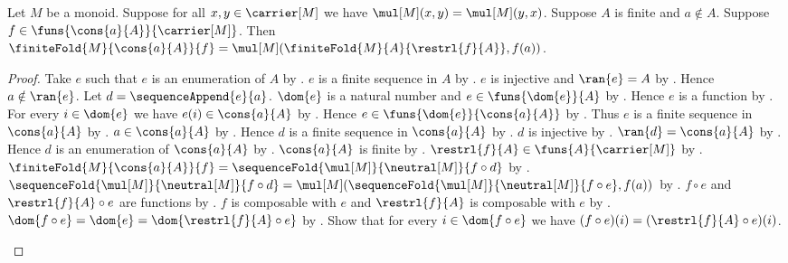\begin{theorem}\label{monoid_finite_fold_fresh_adjoin}
    Let $M$ be a monoid.
    Suppose for all $x,y\in\carrier[M]$ we have
        $\mul[M](x,y)=\mul[M](y,x)$.
    Suppose $A$ is finite and $a\notin A$.
    Suppose $f\in\funs{\cons{a}{A}}{\carrier[M]}$.
    Then
        $\finiteFold{M}{\cons{a}{A}}{f}
        =\mul[M](\finiteFold{M}{A}{\restrl{f}{A}},f(a))$.
\end{theorem}
\begin{proof}
    Take $e$ such that $e$ is an enumeration of $A$ by
        .
    $e$ is a finite sequence in $A$ by
        .
    $e$ is injective and $\ran{e}=A$ by
        .
    Hence $a\notin\ran{e}$.
    Let $d=\sequenceAppend{e}{a}$.
    $\dom{e}$ is a natural number and
        $e\in\funs{\dom{e}}{A}$ by
        .
    Hence $e$ is a function by .
    For every $i\in\dom{e}$ we have $e(i)\in\cons{a}{A}$ by
        .
    Hence $e\in\funs{\dom{e}}{\cons{a}{A}}$ by
        .
    Thus $e$ is a finite sequence in $\cons{a}{A}$ by
        .
    $a\in\cons{a}{A}$ by .
    Hence $d$ is a finite sequence in $\cons{a}{A}$ by
        .
    $d$ is injective by
        .
    $\ran{d}=\cons{a}{A}$ by
        .
    Hence $d$ is an enumeration of $\cons{a}{A}$ by
        .
    $\cons{a}{A}$ is finite by .
    $\restrl{f}{A}\in\funs{A}{\carrier[M]}$ by
        .
    $\finiteFold{M}{\cons{a}{A}}{f}
        =\sequenceFold{\mul[M]}{\neutral[M]}{f\circ d}$ by
        .
    $\sequenceFold{\mul[M]}{\neutral[M]}{f\circ d}
        =\mul[M](
            \sequenceFold{\mul[M]}{\neutral[M]}{f\circ e},f(a))$ by
        .
    $f\circ e$ and $\restrl{f}{A}\circ e$ are functions by
        .
    $f$ is composable with $e$ and $\restrl{f}{A}$ is composable with $e$
        by .
    $\dom{f\circ e}=\dom{e}=\dom{\restrl{f}{A}\circ e}$ by
        .
    Show that for every $i\in\dom{f\circ e}$ we have
        $(f\circ e)(i)=(\restrl{f}{A}\circ e)(i)$.
    \begin{subproof}

\end{subproof}
\end{proof}

